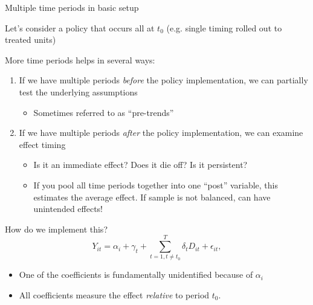 \documentclass[notes,11pt, aspectratio=169]{beamer}
\newenvironment{wideitemize}{\itemize\addtolength{\itemsep}{10pt}}{\enditemize}
\begin{document}
\begin{frame}{Multiple time periods in basic setup}
	\begin{wideitemize}
		\item Let's consider a policy that occurs all at $t_{0}$
		(e.g. single timing rolled out to treated units)
		\item  More time periods helps in several ways:
		\begin{enumerate}
			\item If we have multiple periods \emph{before} the policy implementation, we can partially test the underlying assumptions
			      \begin{itemize}
				      \item Sometimes referred to as ``pre-trends''
			      \end{itemize}
			\item If we have multiple periods \emph{after} the policy implementation, we can examine effect timing
			      \begin{itemize}
				      \item Is it an immediate effect? Does it die off? Is it persistent?
				      \item If you pool all time periods together into one ``post'' variable, this estimates the average effect. If sample is not balanced, can have unintended effects!
			      \end{itemize}
		\end{enumerate}
		\item  How do we implement this?
		\begin{equation*}
			Y_{it} = \alpha_{i} + \gamma_{t} + \sum_{t=1, t\not=t_{0}}^{T}\delta_{t} D_{it} + \epsilon_{it},
		\end{equation*}
		\begin{itemize}
			\item One of the coefficients is fundamentally unidentified
			      because of $\alpha_{i}$
			\item All coefficients measure the effect \emph{relative} to period $t_{0}$.
		\end{itemize}
	\end{wideitemize}
\end{frame}
\end{document}
